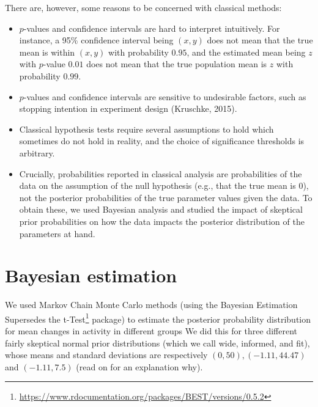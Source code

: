 \documentclass[10pt,]{scrartcl}
\begin{document}
There are, however, some reasons to be concerned with classical methods:

\begin{itemize}
\item
  \(p\)-values and confidence intervals are hard to interpret
  intuitively. For instance, a 95\% confidence interval being \((x,y)\)
  does not mean that the true mean is within \((x,y)\) with probability
  \(0.95\), and the estimated mean being \(z\) with \(p\)-value \(0.01\)
  does not mean that the true population mean is \(z\) with probability
  \(0.99\).
\item
  \(p\)-values and confidence intervals are sensitive to undesirable
  factors, such as stopping intention in experiment design (Kruschke,
  2015).
\item
  Classical hypothesis tests require several assumptions to hold which
  sometimes do not hold in reality, and the choice of significance
  thresholds is arbitrary.
\item
  Crucially, probabilities reported in classical analysis are
  probabilities of the data on the assumption of the null hypothesis
  (e.g., that the true mean is 0), not the posterior probabilities of
  the true parameter values given the data. To obtain these, we used
  Bayesian analysis and studied the impact of skeptical prior
  probabilities on how the data impacts the posterior distribution of
  the parameters at hand.
\end{itemize}

\section{Bayesian estimation}

We used Markov Chain Monte Carlo methods (using the
\textsf{Bayesian Estimation Supersedes the t-Test}\footnote{\url{https://www.rdocumentation.org/packages/BEST/versions/0.5.2}}
package) to estimate the posterior probability distribution for mean
changes in activity in different groups We did this for three different
fairly skeptical normal prior distributions (which we call
\textsf{wide, informed}, and \textsf{fit}), whose means and standard
deviations are respectively \((0,50), (-1.11,44.47)\) and
\((-1.11,7.5)\) (read on for an explanation why).

\footnotesize

\normalsize
\end{document}
